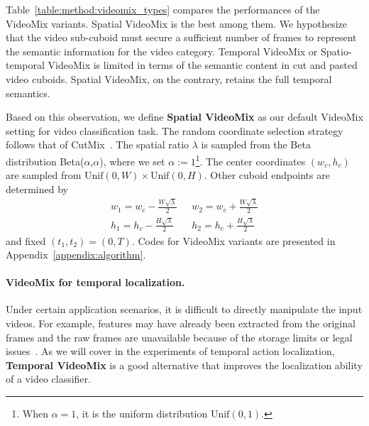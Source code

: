 Table~\ref{table:method:videomix_types} compares the performances of the VideoMix variants. Spatial VideoMix is the best among them. We hypothesize that the video sub-cuboid must secure a sufficient number of frames to represent the semantic information for the video category. Temporal VideoMix or Spatio-temporal VideoMix is limited in terms of the semantic content in cut and pasted video cuboids.
Spatial VideoMix, on the contrary, retains the full temporal semantics.

Based on this observation, we define \textbf{Spatial VideoMix} as our default VideoMix setting for video classification task.
The random coordinate selection strategy follows that of CutMix~\cite{cutmix}.
The spatial ratio $\lambda$ is sampled from the Beta distribution Beta($\alpha$,$\alpha$), where we set $\alpha:=1$\footnote{When $\alpha=1$, it is the uniform distribution $\text{Unif}(0,1)$.}.
The center coordinates $(w_c,h_c)$ are sampled from $\text{Unif}(0,W)\times\text{Unif}(0,H)$. Other cuboid endpoints are determined by 
\begin{equation}
\begin{split}
    w_{1} = w_c - \frac{W\sqrt{\lambda}}{2}~~~ & w_{2} = w_c + \frac{W\sqrt{\lambda}}{2} \\
    h_{1} = h_c - \frac{H\sqrt{\lambda}}{2}~~~ & h_{2} = h_c + \frac{H\sqrt{\lambda}}{2}
\end{split}
\label{eq:sampling}
\end{equation}
and fixed $(t_1,t_2)=(0,T)$.
Codes for VideoMix variants are presented in Appendix~\ref{appendix:algorithm}. 

\paragraph{VideoMix for temporal localization.}
Under certain application scenarios, it is difficult to directly manipulate the input videos. For example, features may have already been extracted from the original frames and the raw frames are unavailable because of the storage limits or legal issues~\cite{abu2016youtube}. 
As we will cover in the experiments of temporal action localization, \textbf{Temporal VideoMix} is a good alternative that improves the localization ability of a video classifier. 



